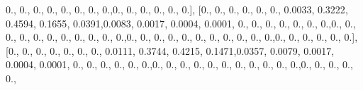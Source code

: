 \documentclass[
]{book}
\newenvironment{Shaded}{\begin{snugshade}}{\end{snugshade}}
\newcommand{\FloatTok}[1]{\textcolor[rgb]{0.00,0.00,0.81}{#1}}
\newcommand{\NormalTok}[1]{#1}
\begin{document}
\begin{Shaded}
\begin{Highlighting}[]
\FloatTok{0.}\NormalTok{, }\FloatTok{0.}\NormalTok{, }\FloatTok{0.}\NormalTok{, }\FloatTok{0.}\NormalTok{, }\FloatTok{0.}\NormalTok{, }\FloatTok{0.}\NormalTok{, }\FloatTok{0.}\NormalTok{, }\FloatTok{0.}\NormalTok{,}\FloatTok{0.}\NormalTok{, }\FloatTok{0.}\NormalTok{, }\FloatTok{0.}\NormalTok{, }\FloatTok{0.}\NormalTok{, }\FloatTok{0.}\NormalTok{, }\FloatTok{0.}\NormalTok{], [}\FloatTok{0.}\NormalTok{, }\FloatTok{0.}\NormalTok{, }\FloatTok{0.}\NormalTok{, }\FloatTok{0.}\NormalTok{, }\FloatTok{0.}\NormalTok{, }\FloatTok{0.}\NormalTok{,}
\FloatTok{0.0033}\NormalTok{, }\FloatTok{0.3222}\NormalTok{, }\FloatTok{0.4594}\NormalTok{, }\FloatTok{0.1655}\NormalTok{, }\FloatTok{0.0391}\NormalTok{,}\FloatTok{0.0083}\NormalTok{, }\FloatTok{0.0017}\NormalTok{, }\FloatTok{0.0004}\NormalTok{, }\FloatTok{0.0001}\NormalTok{, }\FloatTok{0.}\NormalTok{, }\FloatTok{0.}\NormalTok{,}
\FloatTok{0.}\NormalTok{, }\FloatTok{0.}\NormalTok{, }\FloatTok{0.}\NormalTok{, }\FloatTok{0.}\NormalTok{, }\FloatTok{0.}\NormalTok{,}\FloatTok{0.}\NormalTok{, }\FloatTok{0.}\NormalTok{, }\FloatTok{0.}\NormalTok{, }\FloatTok{0.}\NormalTok{, }\FloatTok{0.}\NormalTok{, }\FloatTok{0.}\NormalTok{, }\FloatTok{0.}\NormalTok{, }\FloatTok{0.}\NormalTok{, }\FloatTok{0.}\NormalTok{, }\FloatTok{0.}\NormalTok{, }\FloatTok{0.}\NormalTok{,}\FloatTok{0.}\NormalTok{, }\FloatTok{0.}\NormalTok{, }\FloatTok{0.}\NormalTok{, }\FloatTok{0.}\NormalTok{,}
\FloatTok{0.}\NormalTok{, }\FloatTok{0.}\NormalTok{, }\FloatTok{0.}\NormalTok{, }\FloatTok{0.}\NormalTok{, }\FloatTok{0.}\NormalTok{, }\FloatTok{0.}\NormalTok{, }\FloatTok{0.}\NormalTok{,}\FloatTok{0.}\NormalTok{, }\FloatTok{0.}\NormalTok{, }\FloatTok{0.}\NormalTok{, }\FloatTok{0.}\NormalTok{, }\FloatTok{0.}\NormalTok{, }\FloatTok{0.}\NormalTok{], [}\FloatTok{0.}\NormalTok{, }\FloatTok{0.}\NormalTok{, }\FloatTok{0.}\NormalTok{, }\FloatTok{0.}\NormalTok{, }\FloatTok{0.}\NormalTok{, }\FloatTok{0.}\NormalTok{, }\FloatTok{0.}\NormalTok{,}
\FloatTok{0.0111}\NormalTok{, }\FloatTok{0.3744}\NormalTok{, }\FloatTok{0.4215}\NormalTok{, }\FloatTok{0.1471}\NormalTok{,}\FloatTok{0.0357}\NormalTok{, }\FloatTok{0.0079}\NormalTok{, }\FloatTok{0.0017}\NormalTok{, }\FloatTok{0.0004}\NormalTok{, }\FloatTok{0.0001}\NormalTok{, }\FloatTok{0.}\NormalTok{, }\FloatTok{0.}\NormalTok{,}
\FloatTok{0.}\NormalTok{, }\FloatTok{0.}\NormalTok{, }\FloatTok{0.}\NormalTok{, }\FloatTok{0.}\NormalTok{,}\FloatTok{0.}\NormalTok{, }\FloatTok{0.}\NormalTok{, }\FloatTok{0.}\NormalTok{, }\FloatTok{0.}\NormalTok{, }\FloatTok{0.}\NormalTok{, }\FloatTok{0.}\NormalTok{, }\FloatTok{0.}\NormalTok{, }\FloatTok{0.}\NormalTok{, }\FloatTok{0.}\NormalTok{, }\FloatTok{0.}\NormalTok{, }\FloatTok{0.}\NormalTok{,}\FloatTok{0.}\NormalTok{, }\FloatTok{0.}\NormalTok{, }\FloatTok{0.}\NormalTok{, }\FloatTok{0.}\NormalTok{, }\FloatTok{0.}\NormalTok{,}

\end{Highlighting}
\end{Shaded}
\end{document}
